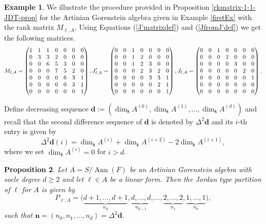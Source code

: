 \documentclass[12pt]{amsart}
\numberwithin{equation}{section}
\theoremstyle{plain} \newtheorem{theorem}{Theorem}[section]
\newtheorem{proposition}[theorem]{Proposition} \newtheorem{lemma}[theorem]{Lemma}
\theoremstyle{definition} \newtheorem{definition}[theorem]{Definition}
\newtheorem{example}[theorem]{Example} \newtheorem{remark}[theorem]{Remark}
\DeclareMathOperator{\ann}{Ann}\DeclareMathOperator{\Char}{char}
\begin{document}
\begin{example}
We illustrate the procedure provided in Proposition \ref{rkmatrix-1-1-JDT-prop} for the Artinian  Gorenstein algebra given in Example \ref{firstEx} with the rank matrix $M_{\ell,A}$. Using Equations (\ref{J'matrixdef}) and  (\ref{JfromJ'def}) we get the following matrices.
$$M_{\ell,A}= \begin{pmatrix}
1&1&1&0&0&0&0\\
0&3&3&2&0&0&0\\
0&0&6&5&3&0&0\\
0&0&0&7&5&2&0\\
0&0&0&0&6&3&1\\
0&0&0&0&0&3&1\\
0&0&0&0&0&0&1\\
\end{pmatrix},
\hspace*{0mm} J^\prime_{\ell,A} = \begin{pmatrix}
0&0&1&0&0&0&0\\
0&0&1&2&0&0&0\\
0&0&1&2&3&0&0\\
0&0&0&2&3&2&0\\
0&0&0&0&3&3&1\\
0&0&0&0&0&2&1\\
0&0&0&0&0&0&1\\
\end{pmatrix}, \hspace*{0mm} J_{\ell,A} = \begin{pmatrix}
0&0&1&0&0&0&0\\
0&0&0&2&0&0&0\\
0&0&0&0&3&0&0\\
0&0&0&0&0&2&0\\
0&0&0&0&0&0&1\\
0&0&0&0&0&0&0\\
0&0&0&0&0&0&0\\
\end{pmatrix}. $$
\end{example}
Define decreasing sequence  $\mathbf{d}:=(\dim_{\mathsf{k}}A^{(0)}, \dim_{\mathsf{k}}A^{(1)}, \dots , \dim_{\mathsf{k}}A^{(d)})$ and recall that the second difference sequence of $\mathbf{d}$ is denoted by $\Delta^2 \mathbf{d}$ and its  $i$-th entry is given by $$\Delta^2 \mathbf{d}(i)=\dim_{\mathsf{k}}A^{(i)}+\dim_{\mathsf{k}}A^{(i+2)}-2\dim_{\mathsf{k}}A^{(i+1)},$$
where we set $\dim_{\mathsf{k}}A^{(i)}=0$ for $i>d$.
\begin{proposition}\label{JT}
Let $A=S/\ann(F)$ be an Artinian  Gorenstein algebra with socle degree $d\geq 2$ and let $\ell\in A$ be a linear form. Then the Jordan type partition of $\ell$ for $A$ is given by
$$
P_{\ell,A} = \big(\underbrace{d+1,\dots ,d+1}_{n_{d}} ,\underbrace{d,\dots ,d}_{n_{d-1}} ,\dots ,\underbrace{2,\dots ,2}_{n_1},\underbrace{1,\dots ,1}_{n_0}\big),
$$
such that $\mathbf{n}=(n_0,n_{1}, \dots , n_d)=\Delta^2 \mathbf{d}.$
\end{proposition}
\end{document}
